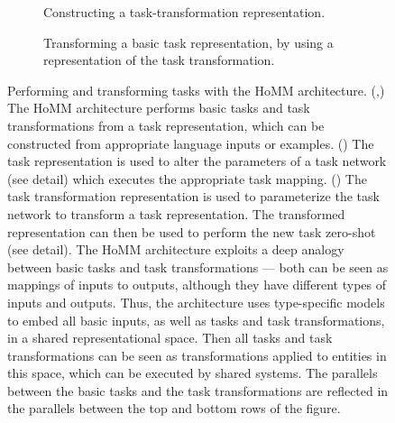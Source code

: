 \documentclass[12pt]{article}
\begin{document}
\begin{figure}[H]
{\begin{tikzpicture}[auto]
\end{tikzpicture}
}
\begin{subfigure}[t]{0.4\textwidth}
\vspace{-1em}
\caption{Constructing a task-transformation\phantom{blahblah} representation.}\label{fig:HoMM_architecture:constructing_meta}
\end{subfigure}%
\begin{subfigure}[t]{0.6\textwidth}
\vspace{-1em}
\caption{Transforming a basic task representation, by using a representation of the task transformation.}\label{fig:HoMM_architecture:performing_meta}
\end{subfigure}
\caption[Performing and transforming tasks with the HoMM architecture.]{Performing and transforming tasks with the HoMM architecture. (,) The HoMM architecture performs basic tasks and task transformations from a task representation, which can be constructed from appropriate language inputs or examples.  () The task representation is used to alter the parameters of a task network (see detail) which executes the appropriate task mapping. () The task transformation representation is used to parameterize the task network to transform a task representation. The transformed representation can then be used to perform the new task zero-shot (see detail). The HoMM architecture exploits a deep analogy between basic tasks and task transformations --- both can be seen as mappings of inputs to outputs, although they have different types of inputs and outputs. Thus, the architecture uses type-specific models to embed all basic inputs, as well as tasks and task transformations, in a shared representational space. Then all tasks and task transformations can be seen as transformations applied to entities in this space, which can be executed by shared systems. The parallels between the basic tasks and the task transformations are reflected in the parallels between the top and bottom rows of the figure.} \label{fig:HoMM_architecture}
\end{figure}
\end{document}
